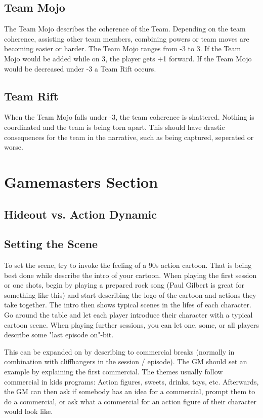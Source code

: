 \documentclass{book}
\begin{document}
\section*{Team Mojo}
The Team Mojo describes the coherence of the Team. Depending on the team coherence, assisting other team members, combining powers or team moves are becoming easier or harder. The Team Mojo ranges from -3 to 3. If the Team Mojo would be added while on 3, the player gets +1 forward. If the Team Mojo would be decreased under -3 a Team Rift occurs.

\section*{Team Rift}
When the Team Mojo falls under -3, the team coherence is shattered. Nothing is coordinated and the team is being torn apart. This should have drastic consequences for the team in the narrative, such as being captured, seperated or worse.

\chapter*{Gamemasters Section}
\section*{Hideout vs. Action Dynamic}


\section*{Setting the Scene}
To set the scene, try to invoke the feeling of a 90s action cartoon. That is being best done while describe the intro of your cartoon. When playing the first session or one shots, begin by playing a prepared rock song (Paul Gilbert is great for something like this) and start describing the logo of the cartoon and actions they take together. The intro then shows typical scenes in the lifes of each character. Go around the table and let each player introduce their character with a typical cartoon scene. When playing further sessions, you can let one, some, or all players describe some "last episode on"-bit.

This can be expanded on by describing to commercial breaks (normally in combination with cliffhangers in the session / episode). The GM should set an example by explaining the first commercial. The themes usually follow commercial in kids programs: Action figures, sweets, drinks, toys, etc. Afterwards, the GM can then ask if somebody has an idea for a commercial, prompt them to do a commercial, or ask what a commercial for an action figure of their character would look like.
\end{document}
